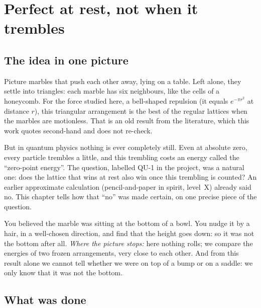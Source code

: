 \chapter{Perfect at rest, not when it trembles}


\section*{The idea in one picture}

Picture marbles that push each other away, lying on a table. Left alone, they settle into
triangles: each marble has six neighbours, like the cells of a honeycomb. For the force studied
here, a bell-shaped repulsion (it equals $e^{-\pi r^2}$ at distance $r$), this triangular
arrangement is the best of the regular lattices when the marbles are motionless. That is an old
result from the literature, which this work quotes second-hand and does not re-check.

But in quantum physics nothing is ever completely still. Even at absolute zero, every particle
trembles a little, and this trembling costs an energy called the ``zero-point energy''. The
question, labelled QU-1 in the project, was a natural one: does the lattice that wins at rest
also win once this trembling is counted? An earlier approximate calculation (pencil-and-paper
in spirit, level~X) already said no. This chapter tells how that ``no'' was made certain, on
one precise piece of the question.

\begin{analogie}
You believed the marble was sitting at the bottom of a bowl. You nudge it by a hair, in a
well-chosen direction, and find that the height goes down: so it was not the bottom after all.
\emph{Where the picture stops:} here nothing rolls; we compare the energies of two frozen
arrangements, very close to each other. And from this result alone we cannot tell whether we
were on top of a bump or on a saddle: we only know that it was not the bottom.
\end{analogie}

\section*{What was done}

